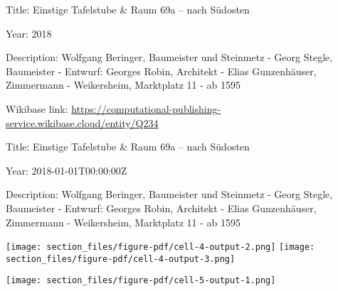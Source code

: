 \documentclass[
  letterpaper,
]{book}
\begin{document}
Title: Einstige Tafelstube \& Raum 69a -- nach Südosten

Year: 2018

Description: Wolfgang Beringer, Baumeister und Steinmetz - Georg Stegle,
Baumeister - Entwurf: Georges Robin, Architekt - Elias Gunzenhäuser,
Zimmermann - Weikersheim, Marktplatz 11 - ab 1595

Wikibase link:
\url{https://computational-publishing-service.wikibase.cloud/entity/Q234}

Title: Einstige Tafelstube \& Raum 69a -- nach Südosten

Year: 2018-01-01T00:00:00Z

Description: Wolfgang Beringer, Baumeister und Steinmetz - Georg Stegle,
Baumeister - Entwurf: Georges Robin, Architekt - Elias Gunzenhäuser,
Zimmermann - Weikersheim, Marktplatz 11 - ab 1595

\texttt{[image: section\_files/figure-pdf/cell-4-output-2.png]}
\texttt{[image: section\_files/figure-pdf/cell-4-output-3.png]}

\texttt{[image: section\_files/figure-pdf/cell-5-output-1.png]}


\backmatter
\end{document}
